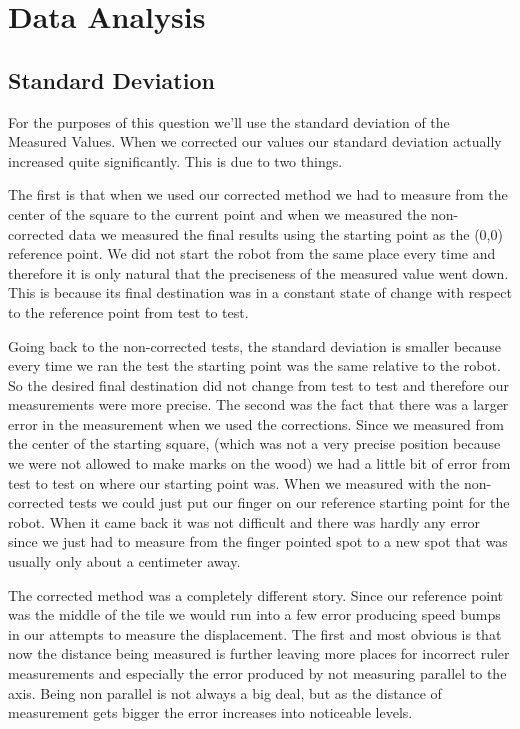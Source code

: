 \documentclass[letterpaper,12pt]{article}
\begin{document}
\section{Data Analysis}{
\subsection{Standard Deviation}{For the purposes of this question we'll use the standard deviation of the Measured Values. When we corrected our values our standard deviation actually increased quite significantly. This is due to two things. 

The first is that when we used our corrected method we had to measure from the center of the square to the current point and when we measured the non-corrected data we measured the final results using the starting point as the (0,0) reference point. We did not start the robot from the same place every time and therefore it is only natural that the preciseness of the measured value went down. This is because its final destination was in a constant state of change with respect to the reference point from test to test. 

Going back to the non-corrected tests, the standard deviation is smaller because every time we ran the test the starting point was the same relative to the robot. So the desired final destination did not change from test to test and therefore our measurements were more precise. The second was the fact that there was a larger error in the measurement when we used the corrections. Since we measured from the center of the starting square, (which was not a very precise position because we were not allowed to make marks on the wood) we had a little bit of error from test to test on where our starting point was. When we measured with the non-corrected tests we could just put our finger on our reference starting point for the robot. When it came back it was not difficult and there was hardly any error since we just had to measure from the finger pointed spot to a new spot that was usually only about a centimeter away. 

The corrected method was a completely different story. Since our reference point was the middle of the tile we would run into a few error producing speed bumps in our attempts to measure the displacement. The first and most obvious is that now the distance being measured is further leaving more places for incorrect ruler measurements and especially the error produced by not measuring parallel to the axis. Being non parallel is not always a big deal, but as the distance of measurement gets bigger the error increases into noticeable levels. 

}}
\end{document}
